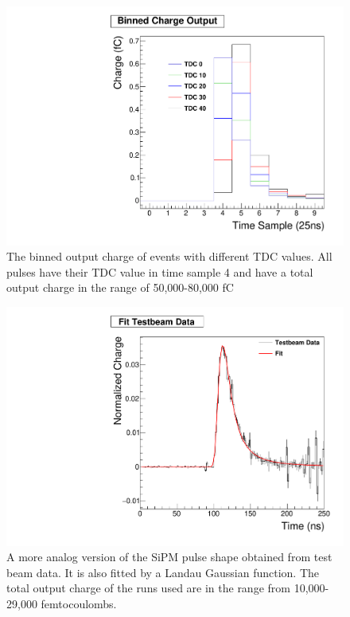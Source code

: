 \begin{figure}
\centering
\includegraphics[width=0.6\linewidth]{Figures/Phase.pdf}
\caption{The binned output charge of events with different TDC values. All pulses have their TDC value in time sample 4 and have a total output charge in the range of 50,000-80,000 fC}
\label{fig:Phase}
\end{figure}

\begin{figure}
\centering
\includegraphics[width=0.6\linewidth]{Figures/FittedPlot.pdf}
\caption{A more analog version of the SiPM pulse shape obtained from test beam data. It is also fitted by a Landau Gaussian function. The total output charge of the runs used are in the range from 10,000-29,000 femtocoulombs.}
\label{fig:fit}
\end{figure}


